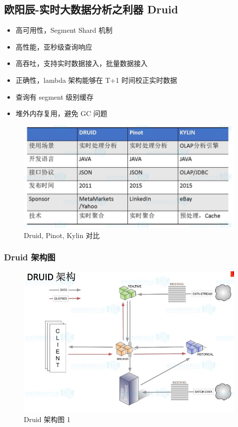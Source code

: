 \documentclass[hyperref, UTF-8]{ctexart}
\begin{document}
\subsection{欧阳辰-实时大数据分析之利器 Druid}
\label{sec:orga1179be}
\label{orgbd98af0}
\begin{itemize}
\item 高可用性，Segment Shard 机制
\item 高性能，亚秒级查询响应
\item 高吞吐，支持实时数据接入，批量数据接入
\item 正确性，lambda 架构能够在 T+1 时间校正实时数据
\item 查询有 segment 级别缓存
\item 堆外内存复用，避免 GC 问题
\end{itemize}

\begin{figure}[htbp]
\centering
\includegraphics[width=.9\linewidth]{PPTNote/Jietu20171129-160336_2017-11-29_16-04-17.jpg}
\caption{Druid, Pinot, Kylin 对比}
\end{figure}

\subsubsection{Druid 架构图}
\label{sec:org7b0138c}
\begin{figure}[htbp]
\centering
\includegraphics[width=.9\linewidth]{PPTNote/Jietu20171129-154839_2017-11-29_15-49-18.jpg}
\caption{Druid 架构图 1}
\end{figure}
\end{document}
